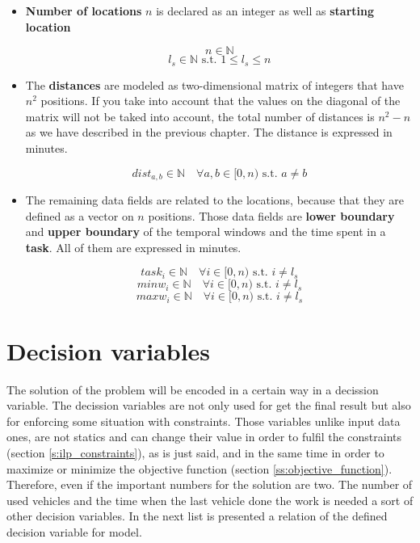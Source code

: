 \documentclass[]{report}
\begin{document}
\begin{itemize}
	\item \textbf{Number of locations} $n$ is declared as an integer as well as \textbf{starting location}
	
	$$n \in \mathbb{N}$$			
	$$l_{s} \in \mathbb{N} \text{ s.t. } 1 \leq l_{s} \leq n$$
	
	\item The \textbf{distances} are modeled as two-dimensional matrix of integers that have $n^{2}$ positions. If you take into account that the values on the diagonal of the matrix will not be taked into account, the total number of distances is $n^{2}-n$ as we have described in the previous chapter. The distance is expressed in minutes.

	$$dist_{a,b} \in \mathbb{N} \quad \forall a,b \in [0, n) \text{ s.t. } a \neq b$$
	
	\item The remaining data fields are related to the locations, because that they are defined as a vector on $n$ positions. Those data fields are \textbf{lower boundary} and \textbf{upper boundary} of the temporal windows and the time spent in a \textbf{task}. All of them are expressed in minutes.

	$$task_{i}  \in \mathbb{N} \quad \forall i \in [0, n) \text{ s.t. } i \neq l_{s}$$
	$$minw_{i}  \in \mathbb{N} \quad \forall i \in [0, n) \text{ s.t. } i \neq l_{s}$$
	$$maxw_{i}  \in \mathbb{N} \quad \forall i \in [0, n) \text{ s.t. } i \neq l_{s}$$
\end{itemize}

\section{Decision variables}\label{s:decision_variable}

The solution of the problem will be encoded in a certain way in a decission variable. The decission variables are not only used for get the final result but also for enforcing some situation with constraints. Those variables unlike input data ones, are not statics and can change their value in order to fulfil the constraints (section \ref{s:ilp_constraints}), as is just said, and in the same time in order to maximize or minimize the objective function (section \ref{ss:objective_function}). Therefore, even if the important numbers for the solution are two. The number of used vehicles and the time when the last vehicle done the work is needed a sort of other decision variables. In the next list is presented a relation of the defined decision variable for model.
\end{document}
